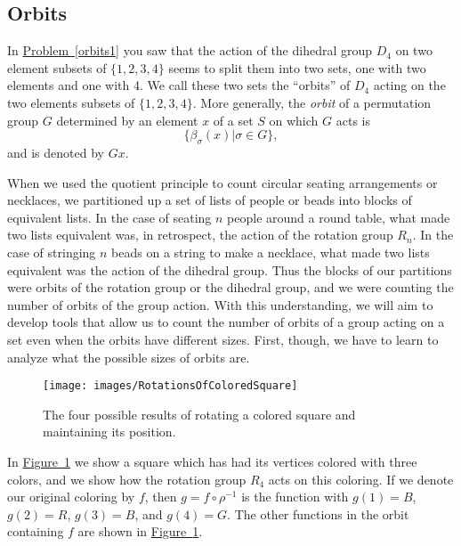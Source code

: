 \documentclass[10pt,]{book}
\theoremstyle{plain}
\theoremstyle{definition}
\numberwithin{equation}{chapter}
\begin{document}
\subsection[{Orbits}]{Orbits}\label{subsection-65}
In \hyperref[orbits1]{Problem~\ref{orbits1}} you saw that the action of the dihedral group \(D_4\) on two element subsets of \(\{1,2,3,4\}\) seems to split them into two sets, one with two elements and one with 4. We call these two sets the ``orbits'' of \(D_4\) acting on the two elements subsets of \(\{1,2,3,4\}\). More generally, the \emph{orbit} of a permutation group \(G\) determined by an element \(x\) of a set \(S\) on which \(G\) acts is%
\begin{equation*}
\{\beta_{\sigma}(x)| \sigma \in G\},
\end{equation*}
and is denoted by \(Gx\).%
\par
When we used the quotient principle to count circular seating arrangements or necklaces, we partitioned up a set of lists of people or beads into blocks of equivalent lists. In the case of seating \(n\) people around a round table, what made two lists equivalent was, in retrospect, the action of the rotation group \(R_n\). In the case of stringing \(n\) beads on a string to make a necklace, what made two lists equivalent was the action of the dihedral group. Thus the blocks of our partitions were orbits of the rotation group or the dihedral group, and we were counting the number of orbits of the group action. With this understanding, we will aim to develop tools that allow us to count the number of orbits of a group acting on a set even when the orbits have different sizes. First, though, we have to learn to analyze what the possible sizes of orbits are.%
\begin{figure}
\centering
\texttt{[image: images/RotationsOfColoredSquare]}
\caption{The four possible results of rotating a colored square and maintaining its position.\label{RotationsOfColoredSquare}}
\end{figure}
In \hyperref[RotationsOfColoredSquare]{Figure~\ref{RotationsOfColoredSquare}} we show a square which has had its vertices colored with three colors, and we show how the rotation group \(R_4\) acts on this coloring. If we denote our original coloring by \(f\), then \(g=f\circ\rho^{-1}\) is the function with \(g(1)=B\), \(g(2) = R\), \(g(3)=B\), and \(g(4)=G\). The other functions in the orbit containing \(f\) are shown in \hyperref[RotationsOfColoredSquare]{Figure~\ref{RotationsOfColoredSquare}}.%
\end{document}
